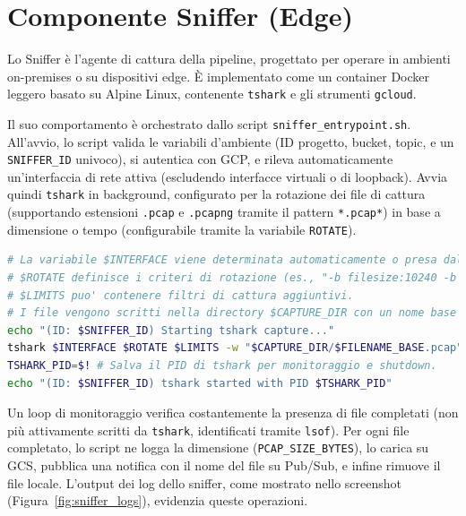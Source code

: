 \documentclass[11pt, a4paper]{article}
\begin{document}
\section{Componente Sniffer (Edge)}
\label{sec:sniffer}

Lo Sniffer è l'agente di cattura della pipeline, progettato per operare in ambienti on-premises o su dispositivi edge. È implementato come un container Docker leggero basato su Alpine Linux, contenente \texttt{tshark} e gli strumenti \texttt{gcloud}.

Il suo comportamento è orchestrato dallo script \texttt{sniffer\_entrypoint.sh}. All'avvio, lo script valida le variabili d'ambiente (ID progetto, bucket, topic, e un \texttt{SNIFFER\_ID} univoco), si autentica con GCP, e rileva automaticamente un'interfaccia di rete attiva (escludendo interfacce virtuali o di loopback). Avvia quindi \texttt{tshark} in background, configurato per la rotazione dei file di cattura (supportando estensioni \texttt{.pcap} e \texttt{.pcapng} tramite il pattern \texttt{*.pcap*}) in base a dimensione o tempo (configurabile tramite la variabile \texttt{ROTATE}).

\begin{lstlisting}[language=bash, style=bashstyle, caption={Estratto da \texttt{sniffer\_entrypoint.sh}: Avvio di \texttt{tshark}.}, label=lst:tshark_start, basicstyle=\ttfamily\scriptsize]
# La variabile $INTERFACE viene determinata automaticamente o presa dall'ambiente.
# $ROTATE definisce i criteri di rotazione (es., "-b filesize:10240 -b duration:60").
# $LIMITS puo' contenere filtri di cattura aggiuntivi.
# I file vengono scritti nella directory $CAPTURE_DIR con un nome base $FILENAME_BASE.
echo "(ID: $SNIFFER_ID) Starting tshark capture..."
tshark $INTERFACE $ROTATE $LIMITS -w "$CAPTURE_DIR/$FILENAME_BASE.pcap" &
TSHARK_PID=$! # Salva il PID di tshark per monitoraggio e shutdown.
echo "(ID: $SNIFFER_ID) tshark started with PID $TSHARK_PID"
\end{lstlisting} 
Un loop di monitoraggio verifica costantemente la presenza di file completati (non più attivamente scritti da \texttt{tshark}, identificati tramite \texttt{lsof}). Per ogni file completato, lo script ne logga la dimensione (\texttt{PCAP\_SIZE\_BYTES}), lo carica su GCS, pubblica una notifica con il nome del file su Pub/Sub, e infine rimuove il file locale. L'output dei log dello sniffer, come mostrato nello screenshot (Figura~\ref{fig:sniffer_logs}), evidenzia queste operazioni.
\end{document}

